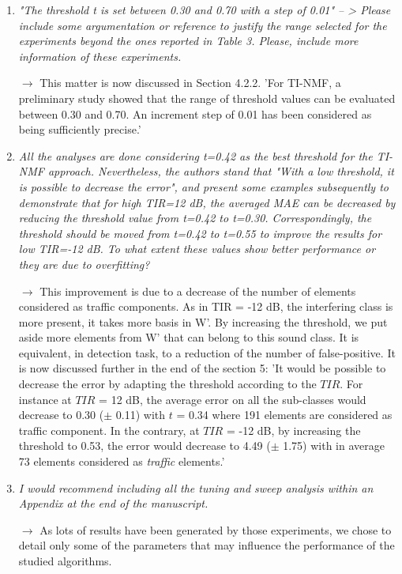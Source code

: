\documentclass[10pt]{article}
\begin{document}
\begin{enumerate}
\item \emph{"The threshold t is set between 0.30 and 0.70 with a step of 0.01" -- > Please include some argumentation or reference to justify the range selected for the experiments beyond the ones reported in Table 3. Please, include more information of these experiments.}

$\rightarrow$ This matter is now discussed in Section 4.2.2. 'For TI-NMF, a preliminary study showed that  the range of threshold values can be evaluated between 0.30 and 0.70. An increment step of 0.01 has been considered as being sufficiently precise.'

\item \emph{All the analyses are done considering t=0.42 as the best threshold for the TI-NMF approach. Nevertheless, the authors stand that "With a low threshold, it is possible to decrease the error", and present some examples subsequently to demonstrate that for high TIR=12 dB, the averaged MAE can be decreased by reducing the threshold value from t=0.42 to t=0.30. Correspondingly, the threshold should be moved from t=0.42 to t=0.55 to improve the results for low TIR=-12 dB. To what extent these values show better performance or they are due to overfitting?}

$\rightarrow$ This improvement is due to a decrease of the number of elements considered as traffic components. As in TIR = -12 dB, the interfering class is more present, it takes more basis in W'. By increasing the threshold, we put aside more elements from W' that can belong to this sound class. It is equivalent, in detection task, to a reduction of the number of false-positive. It is now discussed further in the end of the section 5: 'It would be possible to decrease the error by adapting the threshold according to the $TIR$. For instance at $TIR$ = 12 dB, the average error on all the sub-classes would decrease to 0.30 ($\pm$ 0.11) with $t$ = 0.34 where 191 elements are considered as traffic component. In the contrary, at $TIR$ = -12 dB, by increasing the threshold to 0.53, the error would decrease to 4.49 ($\pm$ 1.75) with in average 73 elements considered as \textit{traffic} elements.'

\item \emph{I would recommend including all the tuning and sweep analysis within an Appendix at the end of the manuscript.}

$\rightarrow$ As lots of results have been generated by those experiments, we chose to detail only some of the parameters that may influence the performance of the studied algorithms.

\end{enumerate}
\end{document}
